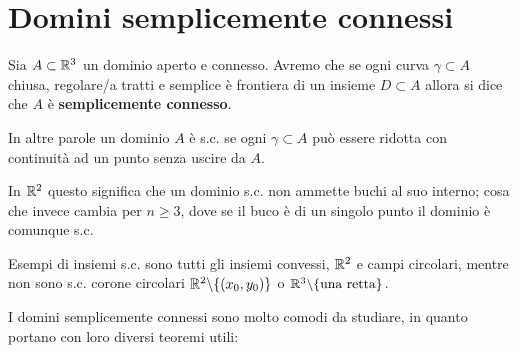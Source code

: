\begin{figure}[!htb]
\end{figure}

\newpage

\section{Domini semplicemente connessi}

Sia $A\subset \mathbb{R}^3$ un dominio aperto e connesso. Avremo che se ogni curva $\gamma\subset A$ chiusa, regolare/a tratti e semplice è frontiera di un insieme $D\subset A$ allora si dice che $A$ è \textbf{semplicemente connesso}.

In altre parole un dominio $A$ è s.c. se ogni $\gamma\subset A$ può essere ridotta con continuità ad un punto senza uscire da $A$.

In $\mathbb{R}^2$ questo significa che un dominio s.c. non ammette buchi al suo interno; cosa che invece cambia per $n\geq 3$, dove se il buco è di un singolo punto il dominio è comunque s.c.

\bigskip

Esempi di insiemi s.c. sono tutti gli insiemi convessi, $\mathbb{R}^2$ e campi circolari, mentre non sono s.c. corone circolari $\mathbb{R}^2 \backslash \{ (x_0,y_0) \}$ o $\mathbb{R}^3\backslash \{ \text{una retta} \}$.

\bigskip

I domini semplicemente connessi sono molto comodi da studiare, in quanto portano con loro diversi teoremi utili:

